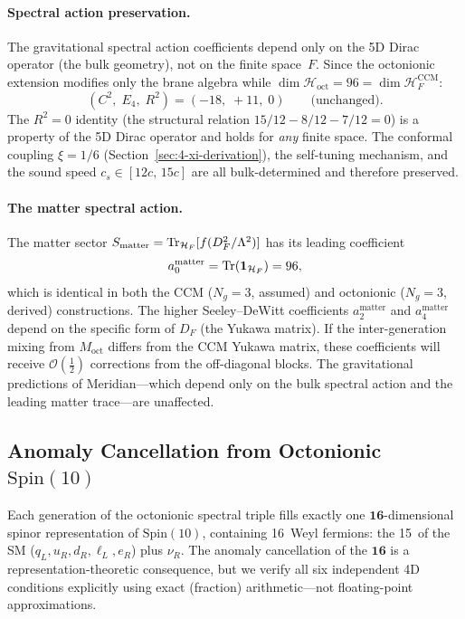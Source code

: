 \paragraph{Spectral action preservation.}
The gravitational spectral action coefficients depend only on the 5D Dirac operator (the bulk geometry), not on the finite space~$F$. Since the octonionic extension modifies only the brane algebra while $\dim \mathcal{H}_{\mathrm{oct}} = 96 = \dim \mathcal{H}_F^{\mathrm{CCM}}$:
\begin{equation}
  (C^2,\; E_4,\; R^2) = (-18,\; +11,\; 0) \qquad \text{(unchanged)}.
  \label{eq:4-93}
\end{equation}
The $R^2 = 0$ identity (the structural relation $15/12 - 8/12 - 7/12 = 0$) is a property of the 5D Dirac operator and holds for \emph{any} finite space. The conformal coupling $\xi = 1/6$ (Section~\ref{sec:4-xi-derivation}), the self-tuning mechanism, and the sound speed $c_s \in [12c,\, 15c]$ are all bulk-determined and therefore preserved.

\paragraph{The matter spectral action.}
The matter sector $S_{\mathrm{matter}} = \operatorname{Tr}_{\mathcal{H}_F}[f(D_F^2/\Lambda^2)]$ has its leading coefficient
\begin{equation}
  a_0^{\mathrm{matter}} = \operatorname{Tr}(\mathbf{1}_{\mathcal{H}_F}) = 96,
  \label{eq:4-94}
\end{equation}
which is identical in both the CCM ($N_g = 3$, assumed) and octonionic ($N_g = 3$, derived) constructions. The higher Seeley--DeWitt coefficients $a_2^{\mathrm{matter}}$ and $a_4^{\mathrm{matter}}$ depend on the specific form of $D_F$ (the Yukawa matrix). If the inter-generation mixing from $M_{\mathrm{oct}}$ differs from the CCM Yukawa matrix, these coefficients will receive $\mathcal{O}(\tfrac{1}{2})$ corrections from the off-diagonal blocks. The gravitational predictions of Meridian---which depend only on the bulk spectral action and the leading matter trace---are unaffected.


\subsection{Anomaly Cancellation from Octonionic \texorpdfstring{$\mathrm{Spin}(10)$}{Spin(10)}}
\label{sec:4-anomaly}

Each generation of the octonionic spectral triple fills exactly one $\mathbf{16}$-dimensional spinor representation of $\mathrm{Spin}(10)$, containing 16~Weyl fermions: the 15~of the SM ($q_L, u_R, d_R, \ell_L, e_R$) plus $\nu_R$.  The anomaly cancellation of the $\mathbf{16}$ is a representation-theoretic consequence, but we verify all six independent 4D conditions explicitly using exact (fraction) arithmetic---not floating-point approximations.

